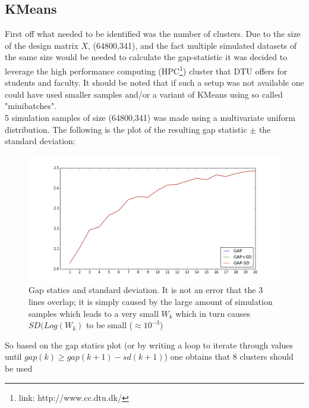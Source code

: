 \subsection{KMeans}
First off what needed to be identified was the number of clusters. 
Due to the size of the design matrix $X$, (64800,341), and the fact multiple simulated datasets of the same size would be needed to calculate the gap-statistic it was decided to leverage the high performance computing (HPC\footnote{link: http://www.cc.dtu.dk/}) cluster that DTU offers for students and faculty. 
 It should be noted that if such a setup was not available one could have used smaller samples and/or a variant of KMeans using so called "minibatches". \\
5 simulation samples of size (64800,341) was made using a multivariate uniform distribution. The following is the plot of the resulting gap statistic $\pm$ the standard deviation:
\begin{figure}[H]
	\center
	\includegraphics[width=\textwidth]{figures/gap.png}
	\caption{Gap statics and standard deviation. It is not an error that the 3 lines overlap; it is simply caused by the large amount of simulation samples which leads to a very small $W_k$ which in turn causes $SD(Log(W_k)$ to be small ($\approx 10^{-3}$)}
	\label{fig:gap}
\end{figure}

So based on the gap statics plot (or by writing a loop to iterate through values until $gap(k)\ge gap(k+1)-sd(k+1)$) one obtains that 8 clusters should be used